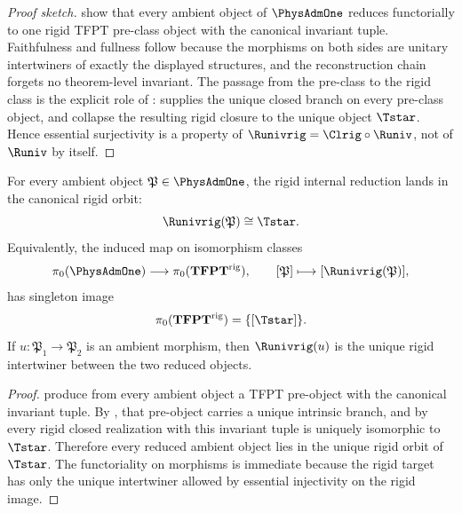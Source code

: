\begin{proof}[Proof sketch]
show that every ambient object of $\PhysAdmOne$ reduces functorially to one rigid TFPT
pre-class object with the canonical invariant tuple. Faithfulness and fullness follow because the
morphisms on both sides are unitary intertwiners of exactly the displayed structures, and the
reconstruction chain forgets no theorem-level invariant. The passage from the pre-class to the
rigid class is the explicit role of : 
supplies the unique closed branch on every pre-class object, and
 collapse the resulting rigid
closure to the unique object $\Tstar$. Hence essential surjectivity is a property of
$\Runivrig=\Clrig\circ\Runiv$, not of $\Runiv$ by itself.
\end{proof}

\fi

\begin{theorem}
\label{thm:universality-tfpt}
For every ambient object $\mathfrak P\in\PhysAdmOne$, the rigid internal reduction lands in the
canonical rigid orbit:
\[
\Runivrig(\mathfrak P)\cong \Tstar.
\]
Equivalently, the induced map on isomorphism classes
\[
\pi_0(\PhysAdmOne)\longrightarrow \pi_0(\mathbf{TFPT}^{\mathrm{rig}}),
\qquad
[\mathfrak P]\longmapsto [\Runivrig(\mathfrak P)],
\]
has singleton image
\[
\pi_0(\mathbf{TFPT}^{\mathrm{rig}})=\{[\Tstar]\}.
\]
If $u:\mathfrak P_1\to\mathfrak P_2$ is an ambient morphism, then $\Runivrig(u)$ is the unique rigid
intertwiner between the two reduced objects.
\end{theorem}

\begin{proof}
produce from every ambient object a TFPT pre-object with the canonical invariant tuple. By
, that pre-object carries a unique intrinsic branch, and by
 every rigid closed realization
with this invariant tuple is uniquely isomorphic to $\Tstar$. Therefore every reduced ambient
object lies in the unique rigid orbit of $\Tstar$. The functoriality on morphisms is immediate
because the rigid target has only the unique intertwiner allowed by essential injectivity on the
rigid image.
\end{proof}

